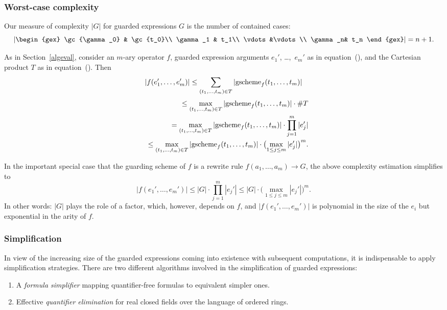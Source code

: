 \subsubsection{Worst-case complexity}
Our measure of complexity $|G|$ for guarded expressions $G$ is the
number of contained cases:
\[
\left|\begin{gex}
\gc{\gamma_0} & \gc{t_0}\\
\gamma_1 & t_1\\
\vdots&\vdots\\
\gamma_n& t_n
\end{gex}\right|=n+1.
\]

As in Section~\ref{algeval}, consider an $m$-ary operator $f$,
guarded expression arguments $e_1'$, \dots,~$e_m'$ as in
equation~(), and the Cartesian product $T$ as in
equation~(). Then
\[
|f(e_1',\ldots,e_m')| \leq  \sum_{(t_1,\dots,t_m)\in
  T}|\textrm{gscheme}_f(t_1,\dots,t_m)|
\]
\begin{eqnarray*}
& &{}\leq  \max_{(t_1,\ldots,t_m)\in
T}|\textrm{gscheme}_f(t_1,\ldots,t_m)|\cdot \#T\\
& & {}=  \max_{(t_1,\ldots,t_m)\in
T}|\textrm{gscheme}_f(t_1,\ldots,t_m)|\cdot \prod_{j=1}^m|e_j'|\\
& & {}\leq  \max_{(t_1,\ldots,t_m)\in
T}|\textrm{gscheme}_f(t_1,\ldots,t_m)|\cdot\bigl(\max_{1\leq j\leq m}|e_j'|\bigr)^m.
\end{eqnarray*}

In the important special case that the guarding scheme of $f$ is a
rewrite rule $f(a_1,\ldots,a_m)\to G$, the above complexity
estimation simplifies to
\[
|f(e_1',\ldots,e_m')| \leq  |G|\cdot \prod_{j=1}^m|e_j'| \leq  |G|\cdot
\bigl(\max_{1\leq j\leq m}|e_j'|\bigr)^m.
\]
In other words: $|G|$ plays the role of a factor, which, however,
depends on $f$, and $|f(e_1',\ldots,e_m')|$ is polynomial in the size
of the $e_i$ but exponential in the arity of $f$.

%
\subsubsection{Simplification}
In view of the increasing size of the guarded expressions coming into
existence with subsequent computations, it is indispensable to apply
simplification strategies. There are two different algorithms involved
in the simplification of guarded expressions:
\begin{enumerate}
\item
A {\em formula simplifier} mapping quantifier-free formulas to
equivalent simpler ones.
\item
Effective {\em quantifier elimination} for real closed fields
over the language of ordered rings.
\end{enumerate}

